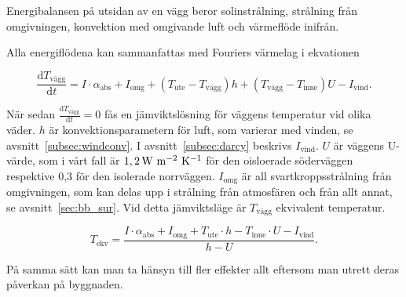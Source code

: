 Energibalansen på utsidan av en vägg beror solinstrålning, strålning från omgivningen, konvektion med omgivande luft och värmeflöde inifrån.

Alla energiflödena kan sammanfattas med Fouriers värmelag i ekvationen 

\begin{equation}
\label{eq:walltemp}
\frac{\mathrm{d}T_\text{vägg}}{\mathrm{d}t} = 
I\cdot \alpha_\text{abs} + I_\text{omg} + (T_\text{ute} - T_\text{vägg}) h +( T_\text{vägg} - T_\text{inne} ) U - I_\text{vind}.
\end{equation}

När sedan $\frac{\mathrm{d}T_\text{vägg}}{\mathrm{d}t}=0$ fås en jämviktslösning för väggens temperatur vid olika väder. $h$ är konvektionsparametern för luft, som varierar med vinden, se avsnitt~\ref{subsec:windconv}. I avsnitt~\ref{subsec:darcy} beskrivs $I_\text{vind}$.
$U$ är väggens U-värde, som i vårt fall är $\unit[1,2]{W~m^{-2}~{K^{-1}}}$ för den oisloerade söderväggen respektive 0,3 för den isolerade norrväggen. $I_\text{omg}$ är all svartkroppsstrålning från omgivningen, som kan delas upp i strålning från atmosfären och från allt annat, se avsnitt~\ref{sec:bb_sur}. Vid detta jämviktsläge är $T_\text{vägg}$ ekvivalent temperatur.

\begin{equation}\boxed{ \; \; \;
\label{eq:ekvtemp}
T_\text{ekv} = 
\frac{I\cdot \alpha_\text{abs} + I_\text{omg} + T_\text{ute} \cdot h - T_\text{inne} \cdot U - I_\text{vind}}{h-U}.
\; \; \;}\end{equation}

På samma sätt kan man ta hänsyn till fler effekter allt eftersom man utrett deras påverkan på byggnaden.
